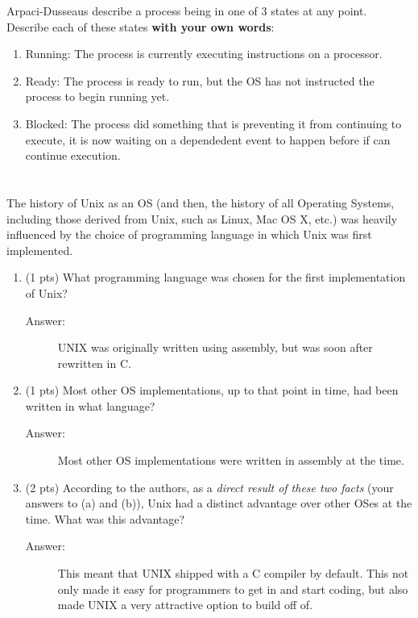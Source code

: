 \documentclass[11pt]{article}
\begin{document}
Arpaci-Dusseaus describe a process being in one of 3 states at any
point. Describe each of these states \textbf{with your own words}:

\begin{enumerate}
\item Running: The process is currently executing instructions on a processor.
\item Ready: The process is ready to run, but the OS has not instructed the process to begin running yet.
\item Blocked: The process did something that is preventing it from continuing to execute, it is now waiting on a dependedent event to happen before if can continue execution.
\end{enumerate}

\section{}
\label{sec:orgb779dc5}

The history of Unix as an OS (and then, the history of all Operating
Systems, including those derived from Unix, such as Linux, Mac OS X,
etc.) was heavily influenced by the choice of programming language in
which Unix was first implemented.

\begin{enumerate}
\item (1 pts) What programming language was chosen for the first
implementation of Unix?

\begin{description}
    \item[Answer:] UNIX was originally written using assembly, but was soon after rewritten in C.
\end{description}

\item (1 pts) Most other OS implementations, up to that point in time, had
been written in what language?

\begin{description}
    \item[Answer:] Most other OS implementations were written in assembly at the time.
\end{description}

\item (2 pts) According to the authors, as a \emph{direct result of these two
facts} (your answers to (a) and (b)), Unix had a distinct advantage
over other OSes at the time. What was this advantage?

\begin{description}
    \item[Answer:] This meant that UNIX shipped with a C compiler by default. This not only made it easy for programmers to get in and start coding, but also made UNIX a very attractive option to build off of.
\end{description}

\end{enumerate}
\end{document}
